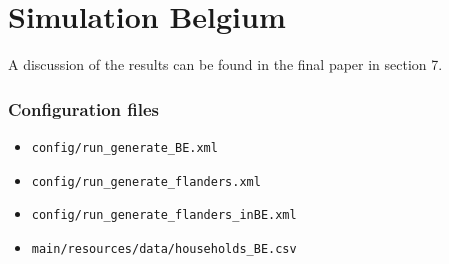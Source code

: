 \documentclass[runningheads]{llncs}
\begin{document}
\section{Simulation Belgium}
A discussion of the results can be found in the final paper in section 7.
\subsubsection{Configuration files}
	\begin{itemize}
		\item \texttt{config/run\_generate\_BE.xml}
		\item \texttt{config/run\_generate\_flanders.xml}
		\item \texttt{config/run\_generate\_flanders\_inBE.xml}
		\\
		\item \texttt{main/resources/data/households\_BE.csv}
	\end{itemize}
\end{document}
